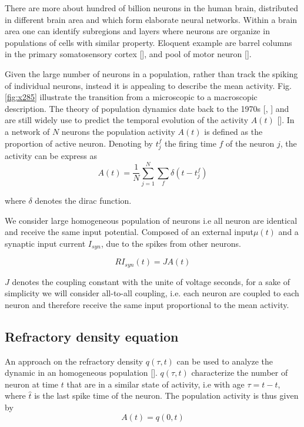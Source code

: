 \documentclass[12pt,twoside]{report}
\begin{document}
There are more about hundred of billion neurons in the human brain, distributed in different brain area and which form elaborate neural networks. Within a brain area one can identify subregions and layers where neurons are organize in populations of cells with similar property. Eloquent example are barrel columns in the primary somatosensory cortex [\cite{Lef09}], and pool of motor neuron [\cite{KanSch00}].

Given the large number of neurons in a population, rather than track the spiking of individual neurons, instead it is appealing to describe the mean activity. Fig.\ref{fig:x285} illustrate the transition from a microscopic to a macroscopic description. The theory of population dynamics date back to the 1970s [\cite{Kni72}, \cite{WilCow72}] and are still widely use to predict the temporal evolution of the activity $A(t)$ [\cite{SchDeg17}]. In a network of $N$ neurons the population activity $A(t)$ is defined as the proportion of active neuron. Denoting by $t^f_j$ the firing time $f$ of the neuron $j$, the activity can be express as
\begin{equation}
A(t)=\frac{1}{N}\sum_{j=1}^N\sum_f\delta(t-t_j^f)
\end{equation}

where $\delta$ denotes the dirac function.

We consider large homogeneous population of neurons i.e all neuron are identical and receive the same input potential. Composed of an external input$\mu(t)$ and a synaptic input current $I_{syn}$, due to the spikes from other neurons.

\begin{equation}
\label{eq:input}
RI_{syn}(t)=JA(t)
\end{equation}

$J$ denotes the coupling constant with the unite of voltage seconds, for a sake of simplicity we will consider all-to-all coupling, i.e. each neuron are coupled to each neuron and therefore receive the same input proportional to the mean activity.

\subsection{Refractory density equation}

An approach on the refractory density $q(\tau,t) $ can be used to analyze the dynamic in an homogeneous population [\cite{GerKis02}]. $q(\tau,t)$ characterize the number of neuron at time $t$ that are in a similar state of activity, i.e with age $\tau=t-\hat{t}$, where $\hat{t}$ is the last spike time of the neuron. The  population activity is thus given by
\begin{equation}
\label{eq:A}
A(t)=q(0,t)
\end{equation}
\end{document}
